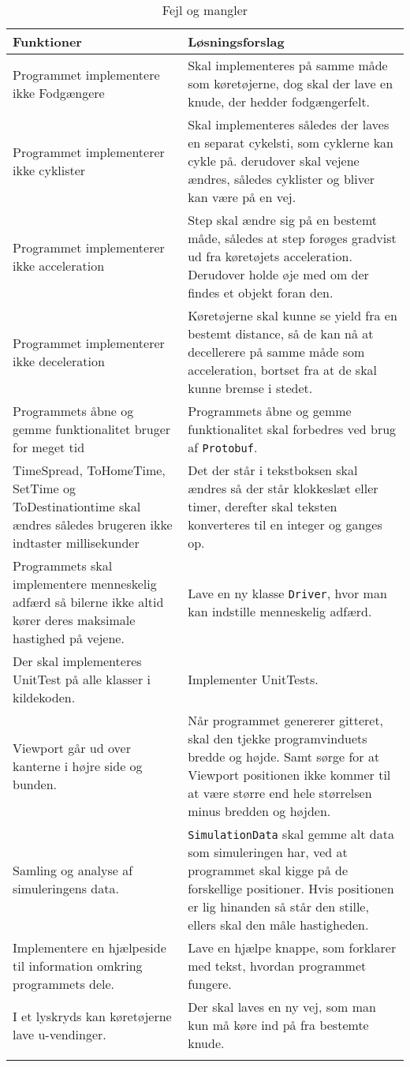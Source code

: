 \setlength{\LTleft}{-20cm plus -1fill}
\setlength{\LTright}{\LTleft}
\begin{longtable}{| p{} | p{} |}
	\hline
\textbf{Funktioner} & \textbf{Løsningsforslag} \\
	\hline
Programmet implementere ikke Fodgængere & Skal implementeres på samme måde som køretøjerne, dog skal der lave en knude, der hedder fodgængerfelt. \\
	\hline
Programmet implementerer ikke cyklister & Skal implementeres således der laves en separat cykelsti, som cyklerne kan cykle på. derudover skal vejene ændres, således cyklister og bliver kan være på en vej. \\ 
	\hline
Programmet implementerer ikke acceleration & Step skal ændre sig på en bestemt måde, således at step forøges gradvist ud fra køretøjets acceleration. Derudover holde øje med om der findes et objekt foran den.\\ 
	\hline
Programmet implementerer ikke deceleration & Køretøjerne skal kunne se yield fra en bestemt distance, så de kan nå at decellerere på samme måde som acceleration, bortset fra at de skal kunne bremse i stedet. \\ 
	\hline
Programmets åbne og gemme funktionalitet bruger for meget tid &  Programmets åbne og gemme funktionalitet skal forbedres ved brug af \texttt{Protobuf}. \\ 
	\hline
TimeSpread, ToHomeTime, SetTime og ToDestinationtime skal ændres således brugeren ikke indtaster millisekunder & Det der står i tekstboksen skal ændres så der står klokkeslæt eller timer, derefter skal teksten konverteres til en integer og ganges op. \\ 
	\hline
Programmets skal implementere menneskelig adfærd så bilerne ikke altid kører deres maksimale hastighed på vejene. & Lave en ny klasse \texttt{Driver}, hvor man kan indstille menneskelig adfærd. \\ 
	\hline
Der skal implementeres UnitTest på alle klasser i kildekoden. & Implementer UnitTests. \\ 
	\hline
Viewport går ud over kanterne i højre side og bunden. & Når programmet genererer gitteret, skal den tjekke programvinduets bredde og højde. Samt sørge for at Viewport positionen ikke kommer til at være større end hele størrelsen minus bredden og højden. \\ 
	\hline
Samling og analyse af simuleringens data. & \texttt{SimulationData} skal gemme alt data som simuleringen har, ved at programmet skal kigge på de forskellige positioner. Hvis positionen er lig hinanden så står den stille, ellers skal den måle hastigheden.\\ 
	\hline
Implementere en hjælpeside til information omkring programmets dele. & Lave en hjælpe knappe, som forklarer med tekst, hvordan programmet fungere. \\ 
	\hline
I et lyskryds kan køretøjerne lave u-vendinger. & Der skal laves en ny vej, som man kun må køre ind på fra bestemte knude. \\ 
	\hline 
\caption{Fejl og mangler}\label{Fejl og mangler}
\end{longtable}



